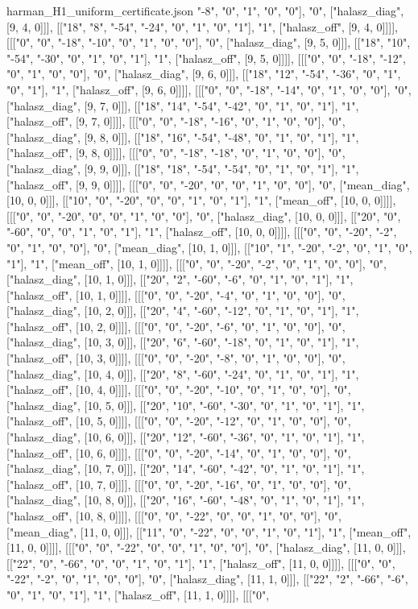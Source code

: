 \begin{filecontents*}[overwrite]{harman_H1_uniform_certificate.json}
"-8", "0", "1", "0", "0"], "0", ["halasz_diag", [9, 4, 0]]], [["18", "8", "-54", "-24", "0", "1", "0", "1"], "1", ["halasz_off", [9, 4, 0]]]], [[["0", "0", "-18", "-10", "0", "1", "0", "0"], "0", ["halasz_diag", [9, 5, 0]]], [["18", "10", "-54", "-30", "0", "1", "0", "1"], "1", ["halasz_off", [9, 5, 0]]]], [[["0", "0", "-18", "-12", "0", "1", "0", "0"], "0", ["halasz_diag", [9, 6, 0]]], [["18", "12", "-54", "-36", "0", "1", "0", "1"], "1", ["halasz_off", [9, 6, 0]]]], [[["0", "0", "-18", "-14", "0", "1", "0", "0"], "0", ["halasz_diag", [9, 7, 0]]], [["18", "14", "-54", "-42", "0", "1", "0", "1"], "1", ["halasz_off", [9, 7, 0]]]], [[["0", "0", "-18", "-16", "0", "1", "0", "0"], "0", ["halasz_diag", [9, 8, 0]]], [["18", "16", "-54", "-48", "0", "1", "0", "1"], "1", ["halasz_off", [9, 8, 0]]]], [[["0", "0", "-18", "-18", "0", "1", "0", "0"], "0", ["halasz_diag", [9, 9, 0]]], [["18", "18", "-54", "-54", "0", "1", "0", "1"], "1", ["halasz_off", [9, 9, 0]]]], [[["0", "0", "-20", "0", "0", "1", "0", "0"], "0", ["mean_diag", [10, 0, 0]]], [["10", "0", "-20", "0", "0", "1", "0", "1"], "1", ["mean_off", [10, 0, 0]]]], [[["0", "0", "-20", "0", "0", "1", "0", "0"], "0", ["halasz_diag", [10, 0, 0]]], [["20", "0", "-60", "0", "0", "1", "0", "1"], "1", ["halasz_off", [10, 0, 0]]]], [[["0", "0", "-20", "-2", "0", "1", "0", "0"], "0", ["mean_diag", [10, 1, 0]]], [["10", "1", "-20", "-2", "0", "1", "0", "1"], "1", ["mean_off", [10, 1, 0]]]], [[["0", "0", "-20", "-2", "0", "1", "0", "0"], "0", ["halasz_diag", [10, 1, 0]]], [["20", "2", "-60", "-6", "0", "1", "0", "1"], "1", ["halasz_off", [10, 1, 0]]]], [[["0", "0", "-20", "-4", "0", "1", "0", "0"], "0", ["halasz_diag", [10, 2, 0]]], [["20", "4", "-60", "-12", "0", "1", "0", "1"], "1", ["halasz_off", [10, 2, 0]]]], [[["0", "0", "-20", "-6", "0", "1", "0", "0"], "0", ["halasz_diag", [10, 3, 0]]], [["20", "6", "-60", "-18", "0", "1", "0", "1"], "1", ["halasz_off", [10, 3, 0]]]], [[["0", "0", "-20", "-8", "0", "1", "0", "0"], "0", ["halasz_diag", [10, 4, 0]]], [["20", "8", "-60", "-24", "0", "1", "0", "1"], "1", ["halasz_off", [10, 4, 0]]]], [[["0", "0", "-20", "-10", "0", "1", "0", "0"], "0", ["halasz_diag", [10, 5, 0]]], [["20", "10", "-60", "-30", "0", "1", "0", "1"], "1", ["halasz_off", [10, 5, 0]]]], [[["0", "0", "-20", "-12", "0", "1", "0", "0"], "0", ["halasz_diag", [10, 6, 0]]], [["20", "12", "-60", "-36", "0", "1", "0", "1"], "1", ["halasz_off", [10, 6, 0]]]], [[["0", "0", "-20", "-14", "0", "1", "0", "0"], "0", ["halasz_diag", [10, 7, 0]]], [["20", "14", "-60", "-42", "0", "1", "0", "1"], "1", ["halasz_off", [10, 7, 0]]]], [[["0", "0", "-20", "-16", "0", "1", "0", "0"], "0", ["halasz_diag", [10, 8, 0]]], [["20", "16", "-60", "-48", "0", "1", "0", "1"], "1", ["halasz_off", [10, 8, 0]]]], [[["0", "0", "-22", "0", "0", "1", "0", "0"], "0", ["mean_diag", [11, 0, 0]]], [["11", "0", "-22", "0", "0", "1", "0", "1"], "1", ["mean_off", [11, 0, 0]]]], [[["0", "0", "-22", "0", "0", "1", "0", "0"], "0", ["halasz_diag", [11, 0, 0]]], [["22", "0", "-66", "0", "0", "1", "0", "1"], "1", ["halasz_off", [11, 0, 0]]]], [[["0", "0", "-22", "-2", "0", "1", "0", "0"], "0", ["halasz_diag", [11, 1, 0]]], [["22", "2", "-66", "-6", "0", "1", "0", "1"], "1", ["halasz_off", [11, 1, 0]]]], [[["0", 
\end{filecontents*}
